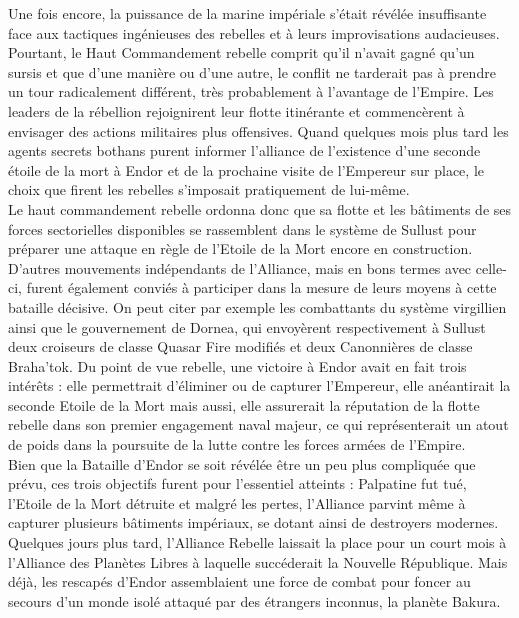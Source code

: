 \documentclass[twoside]{article}
\begin{document}
Une fois encore, la puissance de la marine impériale s'était révélée insuffisante face aux tactiques ingénieuses des rebelles et à leurs improvisations audacieuses.
Pourtant, le Haut Commandement rebelle comprit qu'il n'avait gagné qu'un sursis et que d'une manière ou d'une autre, le conflit ne tarderait pas à prendre un tour radicalement différent, très probablement à l'avantage de l'Empire. Les leaders de la rébellion rejoignirent leur flotte itinérante et commencèrent à envisager des actions militaires plus offensives. Quand quelques mois plus tard les agents secrets bothans purent informer l'alliance de l'existence d'une seconde étoile de la mort à Endor et de la prochaine visite de l'Empereur sur place, le choix que firent les rebelles s'imposait pratiquement de lui-même.\\

Le haut commandement rebelle ordonna donc que sa flotte et les bâtiments de ses forces sectorielles disponibles se rassemblent dans le système de Sullust pour préparer une attaque en règle de l'Etoile de la Mort encore en construction. D'autres mouvements indépendants de l'Alliance, mais en bons termes avec celle-ci, furent également conviés à participer dans la mesure de leurs moyens à cette bataille décisive. On peut citer par exemple les combattants du système virgillien ainsi que le gouvernement de Dornea, qui envoyèrent respectivement à Sullust deux croiseurs de classe Quasar Fire modifiés et deux Canonnières de classe Braha'tok.
Du point de vue rebelle, une victoire à Endor avait en fait trois intérêts : elle permettrait d'éliminer ou de capturer l'Empereur, elle anéantirait la seconde Etoile de la Mort mais aussi, elle assurerait la réputation de la flotte rebelle dans son premier engagement naval majeur, ce qui représenterait un atout de poids dans la poursuite de la lutte contre les forces armées de l'Empire.\\

Bien que la Bataille d'Endor se soit révélée être un peu plus compliquée que prévu, ces trois objectifs furent pour l'essentiel atteints : Palpatine fut tué, l'Etoile de la Mort détruite et malgré les pertes, l'Alliance parvint même à capturer plusieurs bâtiments impériaux, se dotant ainsi de destroyers modernes. Quelques jours plus tard, l'Alliance Rebelle laissait la place pour un court mois à l'Alliance des Planètes Libres à laquelle succéderait la Nouvelle République. Mais déjà, les rescapés d'Endor assemblaient une force de combat pour foncer au secours d'un monde isolé attaqué par des étrangers inconnus, la planète Bakura.
\end{document}
